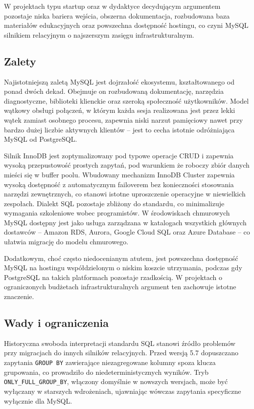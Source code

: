W projektach typu startup oraz w dydaktyce decydującym argumentem pozostaje
niska bariera wejścia, obszerna dokumentacja, rozbudowana baza materiałów
edukacyjnych oraz powszechna dostępność hostingu, co czyni MySQL silnikiem
relacyjnym o najszerszym zasięgu infrastrukturalnym.

\subsection{Zalety}

Najistotniejszą zaletą MySQL jest dojrzałość ekosystemu, kształtowanego od
ponad dwóch dekad. Obejmuje on rozbudowaną dokumentację, narzędzia
diagnostyczne, biblioteki klienckie oraz szeroką społeczność użytkowników.
Model wątkowy obsługi połączeń, w którym każda sesja realizowana jest przez
lekki wątek zamiast osobnego procesu, zapewnia niski narzut pamięciowy
nawet przy bardzo dużej liczbie aktywnych klientów -- jest to cecha istotnie
odróżniająca MySQL od PostgreSQL.

Silnik InnoDB jest zoptymalizowany pod typowe operacje CRUD i zapewnia wysoką
przepustowość prostych zapytań, pod warunkiem że roboczy zbiór danych mieści
się w buffer poolu. Wbudowany mechanizm InnoDB Cluster zapewnia wysoką
dostępność z automatycznym failoverem bez konieczności stosowania narzędzi
zewnętrznych, co stanowi istotne uproszczenie operacyjne w niewielkich
zespołach. Dialekt SQL pozostaje zbliżony do standardu, co minimalizuje
wymagania szkoleniowe wobec programistów. W środowiskach chmurowych MySQL
dostępny jest jako usługa zarządzana w katalogach wszystkich głównych
dostawców -- Amazon RDS, Aurora, Google Cloud SQL oraz Azure Database --
co ułatwia migrację do modelu chmurowego.

Dodatkowym, choć często niedocenianym atutem, jest powszechna dostępność
MySQL na hostingu współdzielonym o niskim koszcie utrzymania, podczas gdy
PostgreSQL na takich platformach pozostaje rzadkością. W projektach
o ograniczonych budżetach infrastrukturalnych argument ten zachowuje
istotne znaczenie.

\subsection{Wady i ograniczenia}

Historyczna swoboda interpretacji standardu SQL stanowi źródło problemów
przy migracjach do innych silników relacyjnych. Przed wersją 5.7 dopuszczano
zapytania \texttt{GROUP BY} zawierające niezagregowane kolumny spoza klucza
grupowania, co prowadziło do niedeterministycznych wyników. Tryb
\texttt{ONLY\_FULL\_GROUP\_BY}, włączony domyślnie w nowszych wersjach,
może być wyłączany w starszych wdrożeniach, ujawniając wówczas zapytania
specyficzne wyłącznie dla MySQL.


